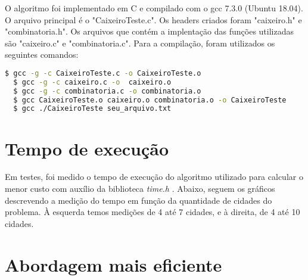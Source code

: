 \documentclass[a4paper, 12pt]{article} %
\begin{document}
		O algoritmo foi implementado em C e compilado com o gcc 7.3.0 (Ubuntu 18.04).	O arquivo principal é o "CaixeiroTeste.c". Os headers criados foram "caixeiro.h" e "combinatoria.h". Os arquivos que contém a implentação das funções utilizadas são "caixeiro.c" e "combinatoria.c". Para a compilação, foram utilizados os seguintes comandos:
		
	\begin{lstlisting}[language=bash]
  $ gcc -g -c CaixeiroTeste.c -o CaixeiroTeste.o
  $ gcc -g -c caixeiro.c -o  caixeiro.o
  $ gcc -g -c combinatoria.c -o combinatoria.o
  $ gcc CaixeiroTeste.o caixeiro.o combinatoria.o -o CaixeiroTeste
  $ gcc ./CaixeiroTeste seu_arquivo.txt
	\end{lstlisting}
		
	\section{Tempo de execução}
	
	Em testes, foi medido o tempo de execução do algoritmo utilizado para calcular o menor custo com auxílio da biblioteca \textit{time.h} . Abaixo, seguem os gráficos descrevendo a medição do tempo em função da quantidade de cidades do problema. À esquerda temos medições de 4 até 7 cidades, e à direita, de 4 até 10 cidades.
	
\begin{flushleft}	
	
	\end{flushleft}
	
	\section{Abordagem mais eficiente}
	
\end{document}
